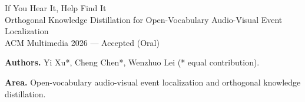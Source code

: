\documentclass[11pt]{article}
\begin{document}
\begin{center}
{\Large If You Hear It, Help Find It}\\[0.4em]
{\large Orthogonal Knowledge Distillation for Open-Vocabulary Audio-Visual Event Localization}\\[0.6em]
{\large ACM Multimedia 2026 — Accepted (Oral)}
\end{center}

\vspace{0.8em}
\noindent\textbf{Authors.} Yi Xu*, Cheng Chen*, Wenzhuo Lei (* equal contribution).

\vspace{0.8em}
\noindent\textbf{Area.} Open-vocabulary audio-visual event localization and orthogonal knowledge distillation.
\end{document}
